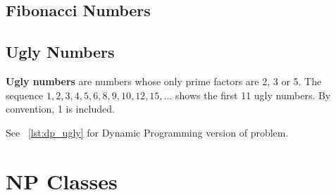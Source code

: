 \documentclass[a4paper,oneside]{book}
\begin{document}
\section{Fibonacci Numbers}
\section{Ugly Numbers}
\begin{definition}
\textbf{Ugly numbers} are numbers whose only prime factors are 2, 3 or 5. The sequence $1, 2, 3, 4, 5, 6, 8, 9, 10, 12, 15, \ldots $ shows the first 11 ugly numbers. By convention, 1 is included.
\end{definition}
See ~\ref{lst:dp_ugly} for Dynamic Programming version of problem.
\chapter{NP Classes}
\end{document}
